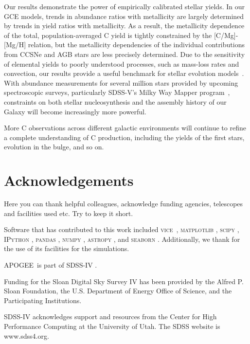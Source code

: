 \documentclass[fleqn,
usenatbib]{mnras}
\newcommand{\VICE}{\textsc{vice}}
\newcommand{\apogee}{APOGEE}
\begin{document}
Our results demonstrate the power of empirically calibrated stellar yields. In our GCE models, trends in abundance ratios with metallicity are largely determined by trends in yield ratios with metallicity. As a result, the metallicity dependence of the total, population-averaged C yield is tightly constrained by the [C/Mg]-[Mg/H] relation, but the metallicity dependencies of the individual contributions from CCSNe and AGB stars are less precisely determined. Due to the sensitivity of elemental yields to poorly understood processes, such as mass-loss rates and convection, our results provide a useful benchmark for stellar evolution models~\citep[see the discussion in e.g.][]{gil-pons2022}. With abundance measurements for several million stars provided by upcoming spectroscopic surveys, particularly SDSS-V's Milky Way Mapper program~\citep{sdssv}, constraints on both stellar nucleosynthesis and the assembly history of our Galaxy will become increasingly more powerful.

More C observations across different galactic environments will continue to refine a complete understanding of C production, including the yields of the first stars,  evolution in the bulge, and so on. 


\section*{Acknowledgements}

 Here you can thank helpful
colleagues, acknowledge funding agencies, telescopes and facilities used etc.
Try to keep it short.

Software that has contributed to this work included  
\VICE~\citep{JW20, james+21},
\textsc{matplotlib} \citep{matplotlib},
\textsc{scipy} \citep{scipy},
\textsc{IPython} \citep{ipy},
\textsc{pandas} \citep{pandas},
\textsc{numpy} \citep{numpy},
\textsc{astropy} \citep{astropy:2013, astropy:2018, astropy:2022},
and 
\textsc{seaborn} \citep{seaborn}
.
Additionally, we thank \citet{OhioSupercomputerCenter1987} for the use of its facilities for the simulations. 

\apogee\ is part of SDSS-IV \citep{sloan_telescope, apogee_instrumentation, sdss_iv_overview, sdss17, apogee17, aspcap}.

Funding for the Sloan Digital Sky 
Survey IV has been provided by the 
Alfred P. Sloan Foundation, the U.S. 
Department of Energy Office of 
Science, and the Participating 
Institutions. 

SDSS-IV acknowledges support and 
resources from the Center for High 
Performance Computing  at the 
University of Utah. The SDSS 
website is www.sdss4.org.
\end{document}
